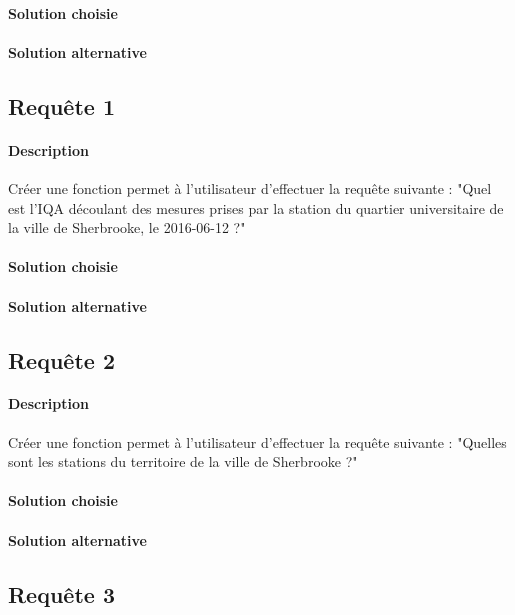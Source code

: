 \documentclass{article}
\begin{document}
\paragraph{Solution choisie}

\paragraph{Solution alternative}

\subsection{Requête 1}
\paragraph{Description} Créer une fonction permet à l'utilisateur
d'effectuer la requête suivante : "Quel est l'IQA découlant des mesures
prises par la station du quartier universitaire de la ville de Sherbrooke,
le 2016-06-12 ?"

\paragraph{Solution choisie}

\paragraph{Solution alternative}

\subsection{Requête 2}
\paragraph{Description} Créer une fonction permet à l'utilisateur
d'effectuer la requête suivante : "Quelles sont les stations du territoire
de la ville de Sherbrooke ?"

\paragraph{Solution choisie}

\paragraph{Solution alternative}

\subsection{Requête 3}
\end{document}
